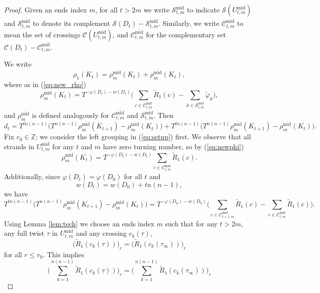 \documentclass[11pt,hyp,]{nyjm}
\newcommand{\Z}{\mathbb{Z}}
\numberwithin{thm}{section}
\theoremstyle{definition}
\theoremstyle{remark}
\begin{document}
	\begin{proof}
		Given an ends index $m$, for all $t > 2m$ we write $\mathcal{S}_{t,m}^\text{mid}$ to indicate $\mathcal{S}(U^\text{mid}_{t,m})$ and $\mathcal{S}_{t,m}^{\overline{\text{mid}}}$ to denote its complement $\mathcal{S}(D_t) - \mathcal{S}^\text{mid}_{t,m}$. Similarly, we write $\mathcal{C}_{t,m}^\text{mid}$ to mean the set of crossings $\mathcal{C}(U^\text{mid}_{t,m})$, and $\mathcal{C}_{t,m}^{\overline{\text{mid}}}$ for the complementary set $\mathcal{C}(D_t) - \mathcal{C}^\text{mid}_{t,m}$.
		
		We write
		$$
		\rho_1(K_t) = \rho^\text{mid}_m(K_t) + \rho^{\overline{\text{mid}}}_m(K_t),
		$$
		where as in (\ref{eq:new_rho})
		$$
		\rho^\text{mid}_m(K_t) = T^{-\varphi(D_t) -w(D_t)} \Big( \sum_{c \in \mathcal{C}_{t,m}^\text{mid}} \tilde{R}_1(c) - \sum_{k \in \mathcal{S}_{t,m}^\text{mid}} \tilde{\varphi}_k \Big),
		$$
		and $\rho^{\overline{\text{mid}}}_m$ is defined analogously for $\mathcal{C}_{t,m}^{\overline{\text{mid}}}$ and $\mathcal{S}_{t,m}^{\overline{\text{mid}}}$. Then
		\begin{equation}
			\label{eq:setup}
			d_t = T^{tn(n - 1)} \big(T^{n(n - 1)} \rho^\text{mid}_m(K_{t + 1}) -  \rho^\text{mid}_m(K_t)\big) + T^{tn(n - 1)}\big(T^{n(n - 1)} \rho^{\overline{\text{mid}}}_m(K_{t + 1}) -  \rho^{\overline{\text{mid}}}_m(K_t) \big).
		\end{equation}
		Fix $r_0 \in \Z$; we consider the left grouping in (\ref{eq:setup}) first. We observe that all strands in $U^\text{mid}_{t,m}$ for any $t$ and $m$ have zero turning number, so by (\ref{eq:newphi})
		$$
		\rho^\text{mid}_m(K_t) = T^{-\varphi(D_t) -w(D_t)} \sum_{c \in \mathcal{C}_{t,m}^\text{mid}} \tilde{R}_1(c).
		$$
		Additionally, since $\varphi(D_t) = \varphi(D_0)$ for all $t$ and
		$$
		w(D_t) = w(D_0) + tn(n - 1),
		$$
		we have
		\begin{equation}
			\label{eq:first_grp}
			T^{tn(n - 1)} \big(T^{n(n - 1)} \rho^\text{mid}_m(K_{t + 1}) -  \rho^\text{mid}_m(K_t)\big) = T^{-\varphi(D_0) -w(D_0)}\big(\sum_{c \in \mathcal{C}_{t + 1,m}^\text{mid}} \tilde{R}_1(c) - \sum_{c \in \mathcal{C}_{t,m}^\text{mid}} \tilde{R}_1(c)\big).
		\end{equation}
		Using Lemma \ref{lem:tech} we choose an ends index $m$ such that for any $t > 2m$, any full twist $\tau$ in $U^\text{mid}_{t,m}$ and any crossing $c_k(\tau)$,
		$$
		\big(\widetilde{R}_1(c_k(\tau))\big)_r = \big(\widetilde{R}_1(c_k(\tau_\infty))\big)_r
		$$
		for all $r \leq r_0$. This implies
		$$
		\big(\sum_{k = 1}^{n(n-1)} \widetilde{R}_1(c_k(\tau))\big)_r = \big(\sum_{k = 1}^{n(n-1)} \widetilde{R}_1(c_k(\tau_\infty))\big)_r
$$
\end{proof}
\end{document}
